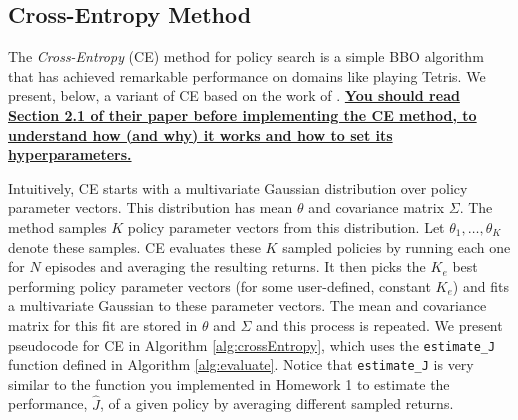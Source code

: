 \documentclass{article}
\begin{document}
\subsection{Cross-Entropy Method}

The \textit{Cross-Entropy} (CE) method for policy search is a simple BBO algorithm that has achieved remarkable performance on domains like playing Tetris. %
%
We present, below, a variant of CE based on the work of \citet{Stulp2021b}. \ul{\textbf{You should read Section 2.1 of their paper before implementing the CE method, to understand how (and why) it works and how to set its hyperparameters.}}

Intuitively, CE starts with a multivariate Gaussian distribution over policy parameter vectors. 
%
This distribution has mean $\theta$ and covariance matrix $\Sigma$.
%
The method samples $K$ policy parameter vectors from this distribution. 
%
Let $\theta_1,\dotsc,\theta_K$ denote these samples. 
%
CE evaluates these $K$ sampled policies by running each one for $N$ episodes and averaging the resulting returns.
%
It then picks the $K_e$ best performing policy parameter vectors (for some user-defined, constant $K_e$) and fits a multivariate Gaussian to these parameter vectors. 
%
The mean and covariance matrix for this fit are stored in $\theta$ and $\Sigma$ and this process is repeated.
%
We present pseudocode for CE in Algorithm \ref{alg:crossEntropy}, which uses the \texttt{estimate\_J} function defined in Algorithm \ref{alg:evaluate}. Notice that \texttt{estimate\_J} is very similar to the function you implemented in Homework 1 to  estimate the performance, $\hat{J}$, of a given policy by averaging different sampled returns.
\\\\
\end{document}
